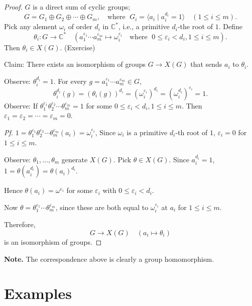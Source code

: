 \documentclass[
]{book}
\theoremstyle{definition}
\theoremstyle{definition}
\theoremstyle{definition}
\theoremstyle{definition}
\theoremstyle{remark}
\begin{document}
\begin{proof}
\(G\) is a direct sum of cyclic groups;
\[G = G_1\oplus G_2 \oplus \cdots \oplus G_m, \quad \textrm{where } \; G_i = \langle a_i\mid a_i^{d_i} = 1\rangle \quad (1\leq i\leq m).\]
Pick any alement \(\omega_i\) of order \(d_i\) in \(\mathbb{C}^*\), i.e., a primitive \(d_i\)-the root of \(1\). Define
\[\theta_i: G \to \mathbb{C}^* \quad (a_1^{\varepsilon_1}\cdots a_m^{\varepsilon_m} \mapsto \omega_i^{\varepsilon_i} \quad \textrm{where }\; 0\leq \varepsilon_i < d_i, 1\leq i\leq m).\]
Then \(\theta_i\in X(G)\). (Exercise)

Claim: There exists an isomorphism of groups \(G \to X(G)\) that sends \(a_i\) to \(\theta_i\).

Observe: \(\theta_i^{d_i} = 1\). For every \(g = a_1^{\varepsilon_1}\cdots a_m^{\varepsilon_m} \in G\),
\[\theta_i^{d_i}(g) = (\theta_i(g))^{d_i} = (\omega_i^{\varepsilon_i})^{d_i} = (\omega_i^{d_i})^{\varepsilon_i} = 1.\]
Observe: If \(\theta_1^{\varepsilon_1}\theta_2^{\varepsilon_2}\cdots \theta_m^{\varepsilon_m} = 1\) for some \(0\leq \varepsilon_i < d_i, 1\leq i\leq m\). Then \(\varepsilon_1 = \varepsilon_2 = \cdots = \varepsilon_m = 0\).

\emph{Pf.} \(1 = \theta_1^{\varepsilon_1}\theta_2^{\varepsilon_2}\cdots \theta_m^{\varepsilon_m}(a_i) = \omega_i^{\varepsilon_i}\), Since \(\omega_i\) is a primitive \(d_i\)-th root of \(1\), \(\varepsilon_i = 0\) for \(1\leq i\leq m\).

Observe: \(\theta_1, \ldots, \theta_m\) generate \(X(G)\). Pick \(\theta\in X(G)\). Since
\(a_i^{d_i} = 1\), \(1 = \theta(a_i^{d_i}) = \theta(a_i)^{d_i}\).

Hence \(\theta(a_i) = \omega^{\varepsilon_i}\) for some \(\varepsilon_i\) with \(0\leq \varepsilon_i < d_i\).

Now \(\theta = \theta_1^{\varepsilon_1}\cdots \theta_m^{\varepsilon_m}\), since these are both equal to \(\omega_i^{\varepsilon_i}\) at \(a_i\) for \(1\leq i \leq m\).

Therefore,
\[G \to X(G) \quad (a_i \mapsto \theta_i)\]
is an isomorphism of groups.
\end{proof}

\textbf{Note.} The correspondence above is clearly a group homomorphism.

\hypertarget{lec4}{%
\chapter{Examples}\label{lec4}}
\end{document}
